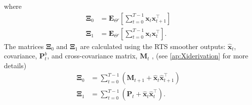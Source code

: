\documentclass[review,authoryear,3p]{elsarticle}
\begin{document}
where
\begin{align}
\boldsymbol\Xi_0&=\mathbf E_{\Theta'}\left[\sum_{t=0}^{T-1}\mathbf x_t\mathbf x_{t+1}^\top\right] \label{eq:MRA-Xi0}\\
\boldsymbol\Xi_1&=\mathbf E_{\Theta'}\left[\sum_{t=0}^{T-1}\mathbf x_t\mathbf x_{t}^\top\right] \label{eq:MRA-Xi1}.
\end{align}
The matrices $\boldsymbol\Xi_0$ and $\boldsymbol\Xi_1$ are calculated using the RTS smoother outputs: $\hat{\mathbf x}_t$, covariance, $\mathbf P_t^b$, and cross-covariance matrix, $\mathbf M_t$ \cite{Gibsona2005}, (see \ref{ap:Xiderivation} for more details)
\begin{align}
\boldsymbol\Xi_0&=\sum_{t=0}^{T-1}\left(\mathbf M_{t+1}+\mathbf{\hat x}_t\mathbf{\hat x}_{t+1}^\top\right) \label{eq:Xi0} \\
 \boldsymbol\Xi_1&=\sum_{t=0}^{T-1}\left(\mathbf P_t+\mathbf{\hat x}_t\mathbf{\hat x}_t^\top\right).  \label{eq:Xi1}
\end{align} 
\end{document}
